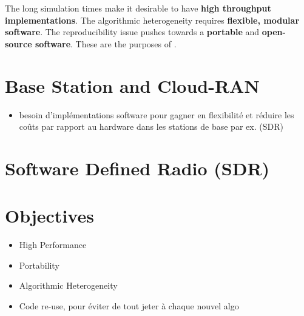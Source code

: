 The long simulation times make it desirable to have \textbf{high throughput
implementations}. The algorithmic heterogeneity requires \textbf{flexible,
modular software}. The reproducibility issue pushes towards a \textbf{portable}
and \textbf{open-source software}. These are the purposes of \AFFECT.

\section{Base Station and Cloud-RAN}

\begin{itemize}
  \item besoin d'implémentations software pour gagner en flexibilité et réduire
    les coûts par rapport au hardware dans les stations de base par ex. (SDR)
\end{itemize}

\section{Software Defined Radio (SDR)}

\section{Objectives}

\begin{itemize}
  \item High Performance
  \item Portability
  \item Algorithmic Heterogeneity
  \item Code re-use, pour éviter de tout jeter à chaque nouvel algo
\end{itemize}
